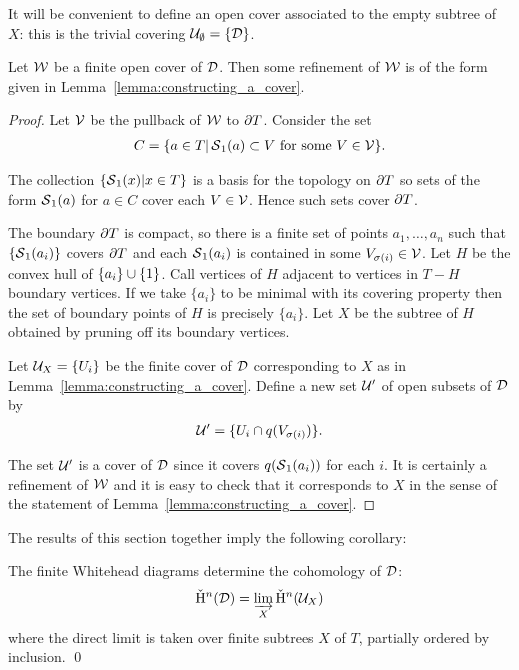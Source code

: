 It will be convenient to define an open cover associated to the empty subtree of $X$: this is the trivial covering $\mathcal{U}_\emptyset = \{\mathcal{D}\}$.

\begin{lemma}\label{lemma:refining}
  Let $\mathcal{W}$ be a finite open cover of\/ $\mathcal{D}$.
  Then some refinement of\/ $\mathcal{W}$ is of the form given in Lemma~\ref{lemma:constructing_a_cover}.
\end{lemma}

\begin{proof}
Let $\mathcal{V}$ be the pullback of $\mathcal{W}$ to $\partial T$. Consider the set
\begin{align}
  C = \{a \in T \vert \operatorname{\mathcal{S}}_1(a) \subset V \text{ for some } V \in \mathcal{V}\}.
\end{align}

The collection $\{\operatorname{\mathcal{S}}_1(x) \vert x \in T\}$ is a basis for the topology on $\partial T$ so sets of the form $\operatorname{\mathcal{S}}_1(a)$ for $a\in C$ cover each $V \in \mathcal{V}$.
Hence such sets cover $\partial T$.

The boundary $\partial T$ is compact, so there is a finite set of points $a_1, \dots , a_n$ such that $\{\operatorname{\mathcal{S}}_1(a_i) \}$ covers $\partial T$ and each $\operatorname{\mathcal{S}}_1 (a_i)$ is contained in some $V_{\sigma(i)} \in \mathcal{V}$.
Let $H$ be the convex hull of $\{a_i\} \cup \{1\}$.
Call vertices of $H$ adjacent to vertices in $T - H$ boundary vertices.
If we take $\{a_i\}$ to be minimal with its covering property then the set of boundary points of $H$ is precisely $\{a_i\}$.
Let $X$ be the subtree of $H$ obtained by pruning off its boundary vertices.

Let $\mathcal{U}_X = \{U_i\}$ be the finite cover of $\mathcal{D}$ corresponding to $X$ as in Lemma~\ref{lemma:constructing_a_cover}.
Define a new set $\mathcal{U}'$ of open subsets of $\mathcal{D}$ by
\begin{align}
  \mathcal{U}' = \{U_i \cap q(V_{\sigma(i)})\}.
\end{align}

The set $\mathcal{U}'$ is a cover of $\mathcal{D}$ since it covers $q(\operatorname{\mathcal{S}}_1(a_i))$ for each $i$.
It is certainly a refinement of $\mathcal{W}$ and it is easy to check that it corresponds to $X$ in the sense of the statement of Lemma~\ref{lemma:constructing_a_cover}.
\end{proof}

The results of this section together imply the following corollary:

\begin{corollary}
  The finite Whitehead diagrams determine the cohomology of $\mathcal{D}$:
  \begin{align}
  \check{\mathrm{H}}{}^n(\mathcal{D})= \varinjlim_X\check{\mathrm{H}}{}^n (\mathcal{U}_X)
  \end{align}
  where the direct limit is taken over finite subtrees $X$ of $T$, partially ordered by inclusion.
\qed
\end{corollary}


